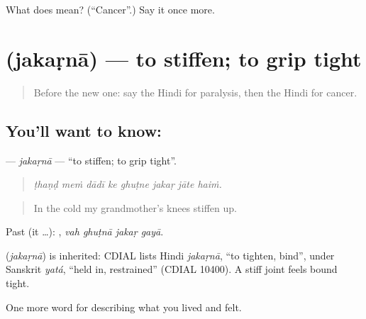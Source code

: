 \begin{tcolorbox}[breakable,colback=teal!4,colframe=teal!35!black,title={Before you move on}]
What does  mean? (\textquotedblleft{}Cancer\textquotedblright{}.) Say it once more.
\end{tcolorbox}
\section[\texorpdfstring{\hi{जकड़ना} (jakaṛnā)}{जकड़ना (jakaṛnā)}]{ (jakaṛnā) — to stiffen; to grip tight}

\label{lesson:HI-C493-jakarna}



\begin{quote}
Before the new one: say the Hindi for paralysis, then the Hindi for cancer.
\end{quote}

\subsection*{You'll want to know: }
\textbf{} — \emph{jakaṛnā} — \textquotedblleft{}to stiffen; to grip tight\textquotedblright{}.

\begin{quote}
       
\end{quote}

\begin{quote}
\emph{ṭhaṇḍ meṁ dādī ke ghuṭne jakaṛ jāte haiṁ.}
\end{quote}

\begin{quote}
In the cold my grandmother's knees stiffen up.
\end{quote}

Past (it …):    , \emph{vah ghuṭnā jakaṛ gayā}.

\begin{cousinweb}
\textbf{} (\emph{jakaṛnā}) is inherited: CDIAL lists Hindi \emph{jakaṛnā}, \textquotedblleft{}to tighten, bind\textquotedblright{}, under Sanskrit \emph{yatá}, \textquotedblleft{}held in, restrained\textquotedblright{} (CDIAL 10400). A stiff joint feels bound tight.
\end{cousinweb}

\begin{grammarlens}[title={What you've built}]
One more word for describing what you lived and felt.
\end{grammarlens}

